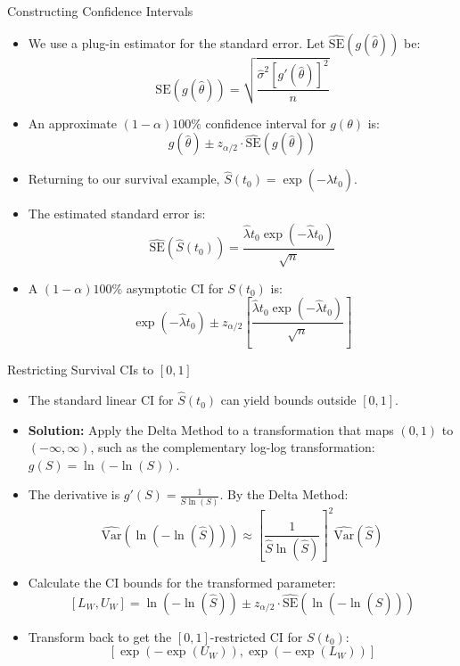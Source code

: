 \documentclass[
  ignorenonframetext,
]{beamer}
\providecommand{\tightlist}{%
  \setlength{\itemsep}{0pt}\setlength{\parskip}{0pt}}
\begin{document}
\begin{frame}{Constructing Confidence Intervals}
\label{constructing-confidence-intervals}
\begin{itemize}
\tightlist
\item
  We use a plug-in estimator for the standard error. Let
  \(\widehat{\text{SE}}(g(\hat{\theta}))\) be:
  \[\widehat{\text{SE}}(g(\hat{\theta})) = \sqrt{\frac{\hat{\sigma}^2 \left[g'(\hat{\theta})\right]^2}{n}}\]
\item
  An approximate \((1 - \alpha)100\%\) confidence interval for
  \(g(\theta)\) is:
  \[g(\hat{\theta}) \pm z_{\alpha/2} \cdot \widehat{\text{SE}}(g(\hat{\theta}))\]
\item
  Returning to our survival example,
  \(\hat{S}(t_0) = \exp(-\hat{\lambda} t_0)\).
\item
  The estimated standard error is:
  \[\widehat{\text{SE}}(\hat{S}(t_0)) = \frac{\hat{\lambda} t_0 \exp(-\hat{\lambda} t_0)}{\sqrt{n}}\]
\item
  A \((1 - \alpha)100\%\) asymptotic CI for \(S(t_0)\) is:
  \[\exp(-\hat{\lambda} t_0) \pm z_{\alpha/2} \left[ \frac{\hat{\lambda} t_0 \exp(-\hat{\lambda} t_0)}{\sqrt{n}} \right]\]
\end{itemize}
\end{frame}

\begin{frame}{Restricting Survival CIs to \([0, 1]\)}
\label{restricting-survival-cis-to-0-1}
\begin{itemize}
\tightlist
\item
  The standard linear CI for \(\hat{S}(t_0)\) can yield bounds outside
  \([0, 1]\).
\item
  \textbf{Solution:} Apply the Delta Method to a transformation that
  maps \((0, 1)\) to \((-\infty, \infty)\), such as the complementary
  log-log transformation: \(g(S) = \ln(-\ln(S))\).
\item
  The derivative is \(g'(S) = \frac{1}{S \ln(S)}\). By the Delta Method:
  \[\widehat{\text{Var}}(\ln(-\ln(\hat{S}))) \approx \left[ \frac{1}{\hat{S} \ln(\hat{S})} \right]^2 \widehat{\text{Var}}(\hat{S})\]
\item
  Calculate the CI bounds for the transformed parameter:
  \[[L_W, U_W] = \ln(-\ln(\hat{S})) \pm z_{\alpha/2} \cdot \widehat{\text{SE}}(\ln(-\ln(\hat{S})))\]
\item
  Transform back to get the \([0, 1]\)-restricted CI for \(S(t_0)\):
  \[\left[ \exp(-\exp(U_W)), \exp(-\exp(L_W)) \right]\]
\end{itemize}
\end{frame}
\end{document}
